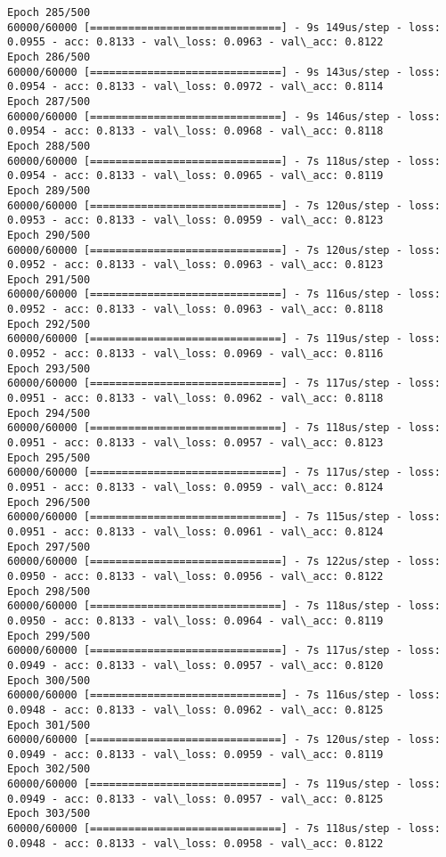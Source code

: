 \documentclass[11pt]{article}
\begin{document}
\begin{Verbatim}[commandchars=\\\{\}]
Epoch 285/500
60000/60000 [==============================] - 9s 149us/step - loss: 0.0955 - acc: 0.8133 - val\_loss: 0.0963 - val\_acc: 0.8122
Epoch 286/500
60000/60000 [==============================] - 9s 143us/step - loss: 0.0954 - acc: 0.8133 - val\_loss: 0.0972 - val\_acc: 0.8114
Epoch 287/500
60000/60000 [==============================] - 9s 146us/step - loss: 0.0954 - acc: 0.8133 - val\_loss: 0.0968 - val\_acc: 0.8118
Epoch 288/500
60000/60000 [==============================] - 7s 118us/step - loss: 0.0954 - acc: 0.8133 - val\_loss: 0.0965 - val\_acc: 0.8119
Epoch 289/500
60000/60000 [==============================] - 7s 120us/step - loss: 0.0953 - acc: 0.8133 - val\_loss: 0.0959 - val\_acc: 0.8123
Epoch 290/500
60000/60000 [==============================] - 7s 120us/step - loss: 0.0952 - acc: 0.8133 - val\_loss: 0.0963 - val\_acc: 0.8123
Epoch 291/500
60000/60000 [==============================] - 7s 116us/step - loss: 0.0952 - acc: 0.8133 - val\_loss: 0.0963 - val\_acc: 0.8118
Epoch 292/500
60000/60000 [==============================] - 7s 119us/step - loss: 0.0952 - acc: 0.8133 - val\_loss: 0.0969 - val\_acc: 0.8116
Epoch 293/500
60000/60000 [==============================] - 7s 117us/step - loss: 0.0951 - acc: 0.8133 - val\_loss: 0.0962 - val\_acc: 0.8118
Epoch 294/500
60000/60000 [==============================] - 7s 118us/step - loss: 0.0951 - acc: 0.8133 - val\_loss: 0.0957 - val\_acc: 0.8123
Epoch 295/500
60000/60000 [==============================] - 7s 117us/step - loss: 0.0951 - acc: 0.8133 - val\_loss: 0.0959 - val\_acc: 0.8124
Epoch 296/500
60000/60000 [==============================] - 7s 115us/step - loss: 0.0951 - acc: 0.8133 - val\_loss: 0.0961 - val\_acc: 0.8124
Epoch 297/500
60000/60000 [==============================] - 7s 122us/step - loss: 0.0950 - acc: 0.8133 - val\_loss: 0.0956 - val\_acc: 0.8122
Epoch 298/500
60000/60000 [==============================] - 7s 118us/step - loss: 0.0950 - acc: 0.8133 - val\_loss: 0.0964 - val\_acc: 0.8119
Epoch 299/500
60000/60000 [==============================] - 7s 117us/step - loss: 0.0949 - acc: 0.8133 - val\_loss: 0.0957 - val\_acc: 0.8120
Epoch 300/500
60000/60000 [==============================] - 7s 116us/step - loss: 0.0948 - acc: 0.8133 - val\_loss: 0.0962 - val\_acc: 0.8125
Epoch 301/500
60000/60000 [==============================] - 7s 120us/step - loss: 0.0949 - acc: 0.8133 - val\_loss: 0.0959 - val\_acc: 0.8119
Epoch 302/500
60000/60000 [==============================] - 7s 119us/step - loss: 0.0949 - acc: 0.8133 - val\_loss: 0.0957 - val\_acc: 0.8125
Epoch 303/500
60000/60000 [==============================] - 7s 118us/step - loss: 0.0948 - acc: 0.8133 - val\_loss: 0.0958 - val\_acc: 0.8122

\end{Verbatim}
\end{document}
